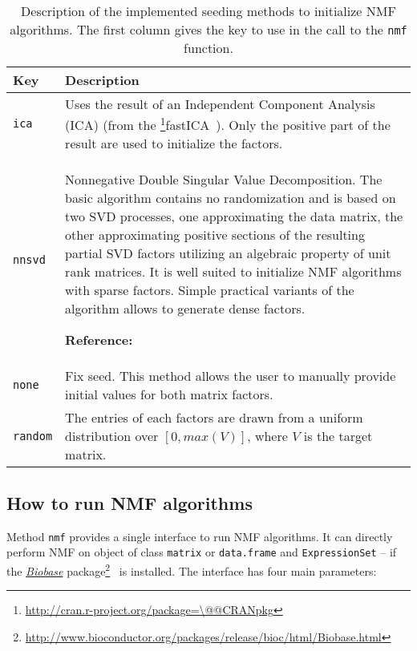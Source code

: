 \documentclass[a4paper]{article}\usepackage{graphicx, color}
\makeatletter
\let\code=\texttt
\newcommand{\pkgname}[1]{\textit{#1}\xspace}
\newcommand{\CRANurl}[1]{\url{http://cran.r-project.org/package=#1}}
\def\CRANpkg{\@ifstar\@CRANpkg\@@CRANpkg}
\def\@CRANpkg#1{\href{http://cran.r-project.org/package=#1}{\pkgname{#1}}\footnote{\CRANurl{#1}}}
\def\@@CRANpkg#1{\href{http://cran.r-project.org/package=#1}{\pkgname{#1}} package\footnote{\CRANurl{#1}}}
\newcommand{\citeCRANpkg}[1]{\CRANpkg{#1}~\cite{#1}}
\newcommand{\BioCurl}[1]{\url{http://www.bioconductor.org/packages/release/bioc/html/#1.html}}
\newcommand{\BioCpkg}[1]{\href{http://www.bioconductor.org/packages/release/bioc/html/#1.html}{\pkgname{#1}} package\footnote{\BioCurl{#1}}}
\newcommand{\citeBioCpkg}[1]{\BioCpkg{#1}~\cite{#1}}
\makeatother
\begin{document}
\begin{table}[h!t]
\begin{tabularx}{\textwidth}{lX}
\hline
Key & Description\\
\hline
\code{ica} & Uses the result of an Independent Component Analysis (ICA) (from
the \citeCRANpkg{fastICA}).
Only the positive part of the result are used to initialize the factors.\\
\hline
%
\code{nnsvd} & Nonnegative Double Singular Value Decomposition.
The basic algorithm contains no randomization and is based on two SVD processes, one approximating the data matrix, the other approximating positive sections of the resulting partial SVD factors utilizing an algebraic property of unit rank matrices. 
It is well suited to initialize NMF algorithms with sparse factors. Simple practical variants of the algorithm allows to generate dense factors.

\textbf{Reference:} \cite{Boutsidis2008}\\
\hline
%
\code{none} & Fix seed.
This method allows the user to manually provide initial values for both matrix factors.\\ 
\hline
%
\code{random} & The entries of each factors are drawn from a uniform distribution over $[0, max(V)]$, where $V$ is the target matrix.\\
\hline
\end{tabularx}
\caption{Description of the implemented seeding methods to initialize NMF algorithms.
The first column gives the key to use in the call to the \texttt{nmf} function.\label{tab:seed}}
\end{table}

\subsection{How to run NMF algorithms}

Method \code{nmf} provides a single interface to run NMF algorithms. 
It can directly perform NMF on object of class \code{matrix} or
\code{data.frame} and \code{ExpressionSet} -- if the \citeBioCpkg{Biobase} is
installed.
The interface has four main parameters:

\medskip
\fbox{\code{nmf(x, rank, method, seed, ...)}}
\end{document}
